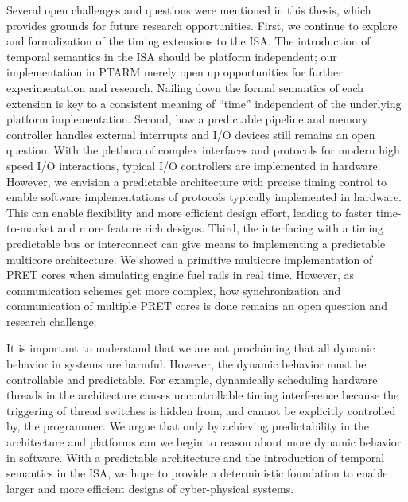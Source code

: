 Several open challenges and questions were mentioned in this thesis, which provides grounds for future research opportunities.  
First, we continue to explore and formalization of the timing extensions to the ISA. 
The introduction of temporal semantics in the ISA should be platform independent; our implementation in PTARM merely open up opportunities for further experimentation and research. 
Nailing down the formal semantics of each extension is key to a consistent meaning of ``time'' independent of the underlying platform implementation. 
Second, how a predictable pipeline and memory controller handles external interrupts and I/O devices still remains an open question.
With the plethora of complex interfaces and protocols for modern high speed I/O interactions, typical I/O controllers are implemented in hardware.
However, we envision a predictable architecture with precise timing control to enable software implementations of protocols typically implemented in hardware. 
This can enable flexibility and more efficient design effort, leading to faster time-to-market and more feature rich designs.        
Third, the interfacing with a timing predictable bus or interconnect can give means to implementing a predictable multicore architecture.
We showed a primitive multicore implementation of PRET cores when simulating engine fuel rails in real time.
However, as communication schemes get more complex, how synchronization and communication of multiple PRET cores is done remains an open question and research challenge. 

It is important to understand that we are not proclaiming that all dynamic behavior in systems are harmful.
However, the dynamic behavior must be controllable and predictable. 
For example, dynamically scheduling hardware threads in the architecture causes uncontrollable timing interference because the triggering of thread switches is hidden from, and cannot be explicitly controlled by, the programmer.
We argue that only by achieving predictability in the architecture and platforms can we begin to reason about more dynamic behavior in software.
With a predictable architecture and the introduction of temporal semantics in the ISA, we hope to provide a deterministic foundation to enable larger and more efficient designs of cyber-physical systems. 

